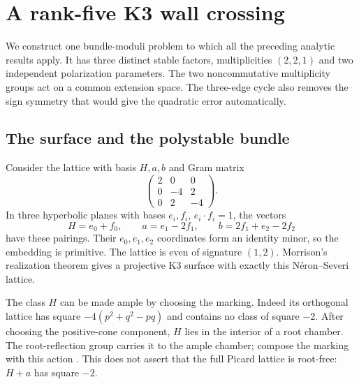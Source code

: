 \section{A rank-five K3 wall crossing}\label{sec:application}

We construct one bundle-moduli problem to which all the preceding
analytic results apply. It has three distinct stable factors,
multiplicities $(2,2,1)$ and two independent polarization parameters.
The two noncommutative multiplicity groups act on a common extension
space. The three-edge cycle also removes the sign symmetry that would
give the quadratic error automatically.

\subsection{The surface and the polystable bundle}
Consider the lattice with basis $H,a,b$ and Gram matrix
\begin{equation}\label{eq:k3-lattice}
 \begin{pmatrix}2&0&0\\0&-4&2\\0&2&-4\end{pmatrix}.
\end{equation}
In three hyperbolic planes with bases $e_i,f_i$, $e_i\cdot f_i=1$,
the vectors
\[
 H=e_0+f_0,\qquad a=e_1-2f_1,\qquad b=2f_1+e_2-2f_2
\]
have these pairings. Their $e_0,e_1,e_2$ coordinates form an identity
minor, so the embedding is primitive. The lattice is even of signature
$(1,2)$. Morrison's realization theorem
\cite[Corollary~1.9(i)]{Mor84} gives a projective K3 surface with
exactly this N\'eron--Severi lattice.

The class $H$ can be made ample by choosing the marking.
Indeed its orthogonal lattice has square
$-4(p^2+q^2-pq)$ and contains no class of square $-2$.
After choosing the positive-cone component, $H$ lies in the interior
of a root chamber. The root-reflection group carries it to the
ample chamber; compose the marking with this action
\cite[\S1, Theorem~3.1 and Corollary~3.2]{Dol96}.
This does not assert that the full Picard lattice is root-free:
$H+a$ has square $-2$.

